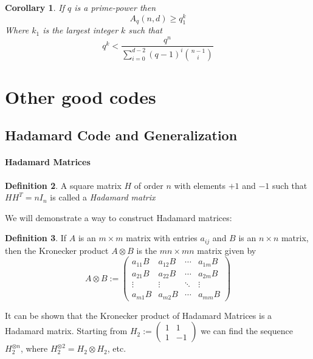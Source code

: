 \documentclass[11pt,a4paper]{article}
\theoremstyle{definition}
\newtheorem{definition}{Definition}[section]
\theoremstyle{plain}
\newtheorem{corollary}[definition]{Corollary}
\theoremstyle{remark}
\begin{document}
\begin{corollary}
    If $q$ is a prime-power then 
    $$A_q(n,d) \geq q^k_1$$
    Where $k_1$ is the largest integer $k$ such that 
    $$q^k < \frac{q^n}{\sum_{i = 0}^{d-2} (q-1)^i \binom{n-1}{i}}$$
\end{corollary} 

\section{Other good codes} 

\subsection{Hadamard Code and Generalization} 

\paragraph{Hadamard Matrices}
\begin{definition}
    A square matrix $H$ of order $n$ with elements $+1$ and $-1$ such that 
    $H H^T = n I_n$ is called a \emph{Hadamard matrix} 
\end{definition}

We will demonstrate a way to construct Hadamard matrices: 

\begin{definition}
    If $A$ is an $m \times m$ matrix with entries $a_{ij}$ and $B$ is an $n \times n$ matrix, then the Kronecker product 
    $A \otimes B$ is the $mn \times mn$ matrix given by 
    $$A \otimes B := \begin{pmatrix}
        a_{11}B & a_{12}B & \cdots & a_{1m}B \\
        a_{21}B & a_{22} B & \cdots & a_{2m} B \\
        \vdots & \vdots & \ddots & \vdots \\
        a_{m1} B & a_{m2} B & \cdots & a_{mm} B 
    \end{pmatrix}$$
\end{definition}

It can be shown that the Kronecker product of Hadamard Matrices is a Hadamard matrix. 
Starting from $H_2 := \begin{pmatrix}
    1 & 1 \\
    1 & -1 
\end{pmatrix}$ we can find the sequence $H_2^{\otimes n}$, where $H_2^{\otimes 2} = H_2 \otimes H_2$, etc. 
\end{document}
